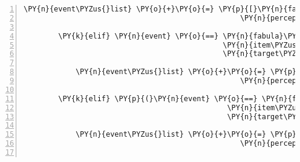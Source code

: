 \begin{Verbatim}[commandchars=\\\{\},numbers=left,firstnumber=1,stepnumber=1]
            \PY{n}{event\PYZus{}list} \PY{o}{+}\PY{o}{=} \PY{p}{[}\PY{n}{fabula}\PY{o}{.}\PY{n}{PerceptionEvent}\PY{p}{(}\PY{n}{identifier}\PY{o}{=}\PY{n}{ID\PYZus{}CASSANDRA}\PY{p}{,}
                                                  \PY{n}{perception}\PY{o}{=}\PY{l+s}{\PYZsq{}}\PY{l+s}{Das Kuchenstück enthält schon genug Eisen.}\PY{l+s}{\PYZsq{}}\PY{p}{)}\PY{p}{]}

        \PY{k}{elif} \PY{n}{event} \PY{o}{==} \PY{n}{fabula}\PY{o}{.}\PY{n}{TriesToDropEvent}\PY{p}{(}\PY{n}{identifier}\PY{o}{=}\PY{n}{ID\PYZus{}CASSANDRA}\PY{p}{,}
                                              \PY{n}{item\PYZus{}identifier}\PY{o}{=}\PY{l+s}{\PYZsq{}}\PY{l+s}{cake}\PY{l+s}{\PYZsq{}}\PY{p}{,}
                                              \PY{n}{target\PYZus{}identifier}\PY{o}{=}\PY{n}{ID\PYZus{}CASSANDRA}\PY{p}{)}\PY{p}{:}

            \PY{n}{event\PYZus{}list} \PY{o}{+}\PY{o}{=} \PY{p}{[}\PY{n}{fabula}\PY{o}{.}\PY{n}{PerceptionEvent}\PY{p}{(}\PY{n}{identifier}\PY{o}{=}\PY{n}{ID\PYZus{}CASSANDRA}\PY{p}{,}
                                                  \PY{n}{perception}\PY{o}{=}\PY{l+s}{\PYZsq{}}\PY{l+s}{Ich bin doch auf Diät!}\PY{l+s}{\PYZsq{}}\PY{p}{)}\PY{p}{]}

        \PY{k}{elif} \PY{p}{(}\PY{n}{event} \PY{o}{==} \PY{n}{fabula}\PY{o}{.}\PY{n}{TriesToDropEvent}\PY{p}{(}\PY{n}{identifier}\PY{o}{=}\PY{n}{ID\PYZus{}CASSANDRA}\PY{p}{,}
                                               \PY{n}{item\PYZus{}identifier}\PY{o}{=}\PY{l+s}{\PYZsq{}}\PY{l+s}{cake}\PY{l+s}{\PYZsq{}}\PY{p}{,}
                                               \PY{n}{target\PYZus{}identifier}\PY{o}{=}\PY{l+s}{\PYZsq{}}\PY{l+s}{pry}\PY{l+s}{\PYZsq{}}\PY{p}{)}\PY{p}{)}\PY{p}{:}

            \PY{n}{event\PYZus{}list} \PY{o}{+}\PY{o}{=} \PY{p}{[}\PY{n}{fabula}\PY{o}{.}\PY{n}{PerceptionEvent}\PY{p}{(}\PY{n}{identifier}\PY{o}{=}\PY{n}{ID\PYZus{}CASSANDRA}\PY{p}{,}
                                                  \PY{n}{perception}\PY{o}{=}\PY{l+s}{\PYZsq{}}\PY{l+s}{Mit Lebensmitteln spielt man nicht!}\PY{l+s}{\PYZsq{}}\PY{p}{)}\PY{p}{]}


\end{Verbatim}
